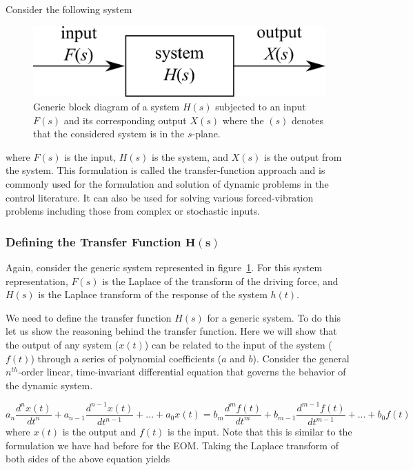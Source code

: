 \documentclass[12pt,letter]{article}
\begin{document}
			Consider the following system
			\begin{figure}[H]
				\centering
				\includegraphics[]{../figures/transfer_function_system.png}
				\caption{Generic block diagram of a system $H(s)$ subjected to an input $F(s)$ and its corresponding output $X(s)$ where the $(s)$ denotes that the considered system is in the $s$-plane.}
				\label{fig:transfer_function_system}
			\end{figure}
			\noindent where $F(s)$ is the input, $H(s)$ is the system, and $X(s)$ is the output from the system. This formulation is called the transfer-function approach and is commonly used for the formulation and solution of dynamic problems in the control literature. It can also be used for solving various forced-vibration problems including those from complex or stochastic inputs. 
	
\subsubsection{Defining the Transfer Function $\mathbf{H(s)}$}

Again, consider the generic system represented in figure~\ref{fig:transfer_function_system}. For this system representation, $F(s)$ is the Laplace of the transform of the driving force, and $H(s)$ is the Laplace transform of the response of the system $h(t)$. 

We need to define the transfer function $H(s)$ for a generic system. To do this let us show the reasoning behind the transfer function. Here we will show that the output of any system ($x(t)$) can be related to the input of the system ($f(t)$) through a series of polynomial coefficients ($a$ and $b$). Consider the general $n^{th}$-order linear, time-invariant differential equation that governs the behavior of the dynamic system.

\begin{equation}
a_n\frac{d^nx(t)}{dt^n} + a_{n-1}\frac{d^{n-1}x(t)}{dt^{n-1}} + ... + a_0x(t) = b_m\frac{d^mf(t)}{dt^m} + b_{m-1}\frac{d^{m-1}f(t)}{dt^{m-1}} + ... + b_0f(t)
\end{equation} 
where $x(t)$ is the output and $f(t)$ is the input. Note that this is similar to the formulation we have had before for the EOM. Taking the Laplace transform of both sides of the above equation yields
\end{document}
